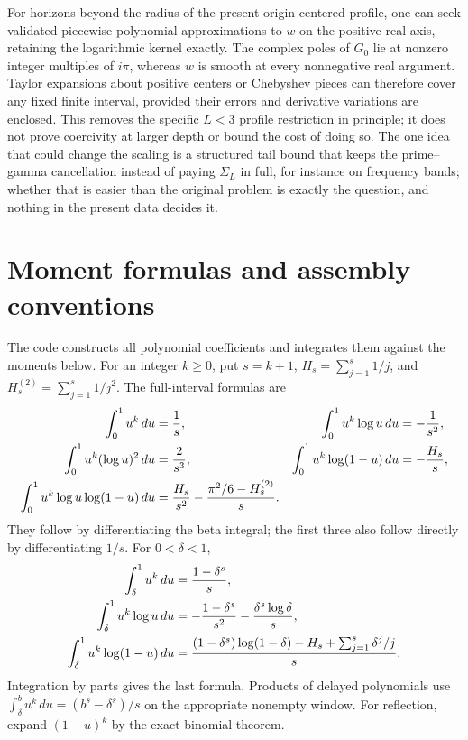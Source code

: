\documentclass[11pt]{article}
\numberwithin{equation}{section}
\theoremstyle{definition}
\theoremstyle{remark}
\begin{document}
For horizons beyond the radius of the present origin-centered profile,
one can seek validated piecewise polynomial approximations to $w$ on the
positive real axis, retaining the logarithmic kernel exactly. The complex
poles of $G_0$ lie at nonzero integer multiples of $i\pi$, whereas $w$ is
smooth at every nonnegative real argument. Taylor expansions about positive
centers or Chebyshev pieces can therefore cover any fixed finite interval,
provided their errors and derivative variations are enclosed. This removes
the specific $L<3$ profile restriction in principle; it does not prove
coercivity at larger depth or bound the cost of doing so. The one idea that
could change the scaling is a structured tail bound that keeps the
prime--gamma cancellation instead of paying $\Sigma_L$ in full, for instance
on frequency bands; whether that is easier than the original problem is
exactly the question, and nothing in the present data decides it.

\appendix
\section{Moment formulas and assembly conventions}\label{app:moments}

The code constructs all polynomial coefficients and integrates them against
the moments below. For an integer $k\ge0$, put $s=k+1$,
$H_s=\sum_{j=1}^s1/j$, and $H_s^{(2)}=\sum_{j=1}^s1/j^2$.
The full-interval formulas are
\begin{align}
 \int_0^1u^k\,du&=\frac1s,&
 \int_0^1u^k\log u\,du&=-\frac1{s^2},\notag\\
 \int_0^1u^k(\log u)^2\,du&=\frac2{s^3},&
 \int_0^1u^k\log(1-u)\,du&=-\frac{H_s}{s},\label{eq:moments}\\
 \int_0^1u^k\log u\log(1-u)\,du
 &=\frac{H_s}{s^2}-\frac{\pi^2/6-H_s^{(2)}}s.\notag
\end{align}
They follow by differentiating the beta integral; the first three also
follow directly by differentiating $1/s$.
For $0<\delta<1$,
\begin{align}
 \int_\delta^1u^k\,du&=\frac{1-\delta^s}s,\notag\\
 \int_\delta^1u^k\log u\,du
 &=-\frac{1-\delta^s}{s^2}-\frac{\delta^s\log\delta}s,\label{eq:tailmoments}\\
 \int_\delta^1u^k\log(1-u)\,du
 &=\frac{(1-\delta^s)\log(1-\delta)-H_s+\sum_{j=1}^s\delta^j/j}{s}.
 \notag
\end{align}
Integration by parts gives the last formula. Products of delayed
polynomials use
$\int_\delta^b u^k\,du=(b^s-\delta^s)/s$ on the appropriate nonempty
window. For reflection, expand $(1-u)^k$ by the exact binomial theorem.
\end{document}

